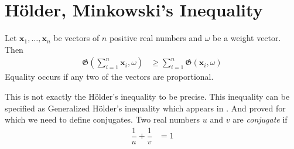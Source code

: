 \documentclass[inequalities.tex]{subfile}
\begin{document}
	\section[Holder and Minkowski]{H\"{o}lder, Minkowski's Inequality}\label{sec:holdmink}

		\begin{theorem}\label{thm:holdergen}
			Let $\mathbf{x}_{1},\ldots,\mathbf{x}_{n}$ be vectors of $n$ positive real numbers and $\omega$ be a weight vector. Then
				\begin{align*}
					\mathfrak{G}\left(\sum\limits_{i=1}^{n}\mathbf{x}_{i},\omega\right)
					& \geq \sum\limits_{i=1}^{n}\mathfrak{G}(\mathbf{x}_{i},\omega)
				\end{align*}
			Equality occurs if any two of the vectors are proportional.
		\end{theorem}
	This is not exactly the H\"{o}lder's inequality to be precise. This inequality can be specified as Generalized H\"{o}lder's inequality which appears in \textcite[Page $117$]{minkowski_1968}. And \textcite{holder_1889} proved  for  which we need to define conjugates. Two real numbers $u$ and $v$ are \textit{conjugate} if
		\begin{align*}
			\dfrac{1}{u}+\dfrac{1}{v}
				& = 1
		\end{align*}
\end{document}
